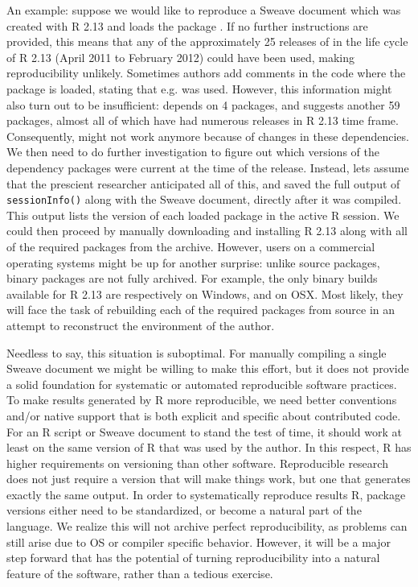 An example: suppose we would like to reproduce a Sweave document which was
created with R 2.13 and loads the  package \citep{caret}. If no further
instructions are provided, this means that any of the approximately 25 releases
of  in the life cycle of R 2.13 (April 2011 to February 2012) could
have been used, making reproducibility unlikely. Sometimes authors add comments
in the code where the package is loaded, stating that e.g.  was
used. However, this information might also turn out to be insufficient:
 depends on 4 packages, and suggests another 59 packages, almost all of which
have had numerous releases in R 2.13 time frame.
Consequently,  might not work anymore because of changes in
these dependencies. We then need to do further investigation to figure out
which versions of the dependency packages were current at the time of the
 release. Instead, lets assume that the prescient researcher
anticipated all of this, and saved the full output of \texttt{sessionInfo()}
along with the Sweave document, directly after it was compiled. This output
lists the version of each loaded package in the active R session.
We could then proceed by manually downloading and installing R 2.13 along with
all of the required packages from the archive. However, users on a commercial
operating systems might be up for another surprise: unlike source packages,
binary packages are not fully archived. For example, the only binary builds
available for R 2.13 are respectively  on Windows, and
 on OSX. Most likely, they will face the task of rebuilding
each of the required packages from source in an attempt to reconstruct the
environment of the author.

Needless to say, this situation is suboptimal. For manually compiling a single
Sweave document we might be willing to make this effort, but it does not
provide a solid foundation for systematic or automated reproducible software
practices. To make results generated by R more reproducible, we need better
conventions and/or native support that is both explicit and specific about
contributed code. For an R script or Sweave document to stand the test of time,
it should work at least on the same version of R that was used by the author. In
this respect, R has higher requirements on versioning than other software.
Reproducible research does not just require a version that will
make things work, but one that generates exactly the same output. In
order to systematically reproduce results R, package versions either need to be
standardized, or become a natural part of the language. We realize this will
not archive perfect reproducibility, as problems can still arise due to OS or
compiler specific behavior. However, it will be a major step forward that has
the potential of turning reproducibility into a natural feature of the
software, rather than a tedious exercise.
 
